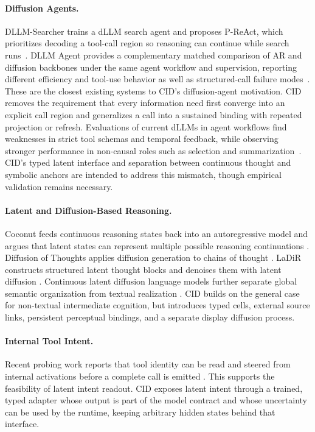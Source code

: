 \paragraph{Diffusion Agents.}
DLLM-Searcher trains a dLLM search agent and proposes P-ReAct, which prioritizes decoding a tool-call region so reasoning can continue while search runs~\citep{zhao2026dllmsearcher}. DLLM Agent provides a complementary matched comparison of AR and diffusion backbones under the same agent workflow and supervision, reporting different efficiency and tool-use behavior as well as structured-call failure modes~\citep{zhen2026dllmagent}. These are the closest existing systems to CID's diffusion-agent motivation. CID removes the requirement that every information need first converge into an explicit call region and generalizes a call into a sustained binding with repeated projection or refresh. Evaluations of current dLLMs in agent workflows find weaknesses in strict tool schemas and temporal feedback, while observing stronger performance in non-causal roles such as selection and summarization~\citep{lu2026bitterlesson}. CID's typed latent interface and separation between continuous thought and symbolic anchors are intended to address this mismatch, though empirical validation remains necessary.

\paragraph{Latent and Diffusion-Based Reasoning.}
Coconut feeds continuous reasoning states back into an autoregressive model and argues that latent states can represent multiple possible reasoning continuations \citep{hao2024coconut}. Diffusion of Thoughts applies diffusion generation to chains of thought \citep{ye2024dot}. LaDiR constructs structured latent thought blocks and denoises them with latent diffusion \citep{kang2025ladir}. Continuous latent diffusion language models further separate global semantic organization from textual realization \citep{guo2026coladlm}. CID builds on the general case for non-textual intermediate cognition, but introduces typed cells, external source links, persistent perceptual bindings, and a separate display diffusion process.

\paragraph{Internal Tool Intent.}
Recent probing work reports that tool identity can be read and steered from internal activations before a complete call is emitted \citep{wu2026toolreadable}. This supports the feasibility of latent intent readout. CID exposes latent intent through a trained, typed adapter whose output is part of the model contract and whose uncertainty can be used by the runtime, keeping arbitrary hidden states behind that interface.
